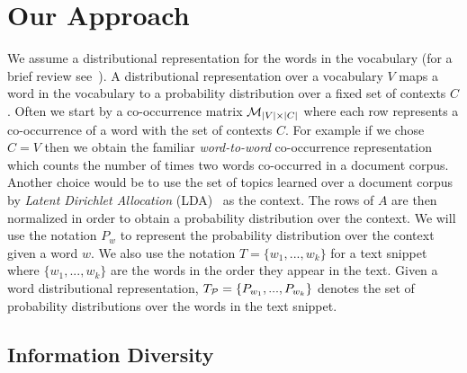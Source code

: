 \documentclass{article} %
\begin{document}
















\section{Our Approach}
\label{sec:our-approach}


We assume a distributional representation for the words in the vocabulary (for a brief review
see~\cite{Turian10wordrepresentations}). A distributional representation over a vocabulary $V$ maps a word in the vocabulary to a 
probability distribution over a fixed set of contexts $C$. Often we start by a co-occurrence matrix ${\mathcal M}_{|V|\times|C|}$ where each row represents a co-occurrence of a word with the set of contexts
$C$. For example if we chose $C=V$ then we obtain the familiar {\sl word-to-word} co-occurrence representation which counts the number
of times two words co-occurred in a document corpus. Another choice would be to use the set of topics learned over a document
corpus by {\sl Latent Dirichlet Allocation} (LDA)~\cite{Blei:2003:LDA:944919.944937} as the context. The rows of $A$
are then normalized in order to obtain a probability distribution over the context. We will use the notation $P_w$ to represent
the probability distribution over the context  given a word $w$. We also use the notation $T=\{w_1,...,w_k\}$ for a text
snippet where
$\{w_1,...,w_k\}$ are the words in the order they appear in the
text. Given a word distributional representation, $T_{{\mathcal P}}=\{P_{w_1},...,P_{w_k}\}$ denotes the set of probability distributions over the words
in the text snippet.


\subsection{Information Diversity}
\label{sec:information-diversity}
\end{document}
